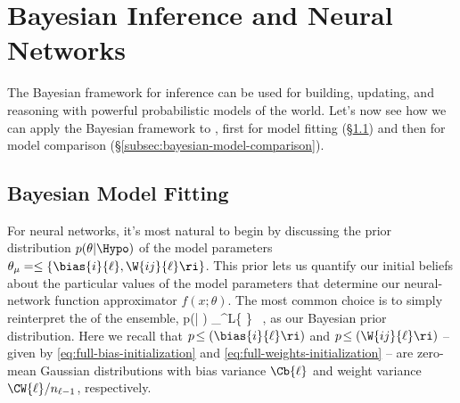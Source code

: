 \section{Bayesian Inference and Neural Networks}\label{sec:PP-Bayes-2}
The Bayesian framework for inference can be used for building, updating, and reasoning with powerful probabilistic models of the world.
Let's now see how we can apply the Bayesian framework to , first 
for 
model fitting (\S\ref{subsec:ForIO}) and then 
for 
model comparison (\S\ref{subsec:bayesian-model-comparison}).





\subsection{Bayesian Model Fitting}\label{subsec:ForIO}
For neural networks, it's most natural to begin by discussing the  prior distribution $p(\theta \vert\Hypo)$ of the model parameters $\theta_{\mu}=\le\{\bias{i}{\ell},\W{ij}{\ell}\ri\}$.
This prior lets us quantify our initial beliefs about the particular values of the model parameters that determine our neural-network function approximator $f(x; \theta)$. The most common choice  is to simply reinterpret the  of the ensemble,
\be\label{eq:parameter-prior}
p(\theta | \Hypo) \equiv \prod_{}^{L}\le\{ \le[\prod_{i=1}^{n_
\ell} p\!\le(\bias{i}{\ell}\ri) \ri] \le[ \prod_{i=1}^{n_\ell}\prod_{j=1}^{n_{\ell-1} } p\!\le(\W{ij}{\ell}\ri) \ri] \ri\} \, ,
\ee
as our Bayesian prior distribution.
Here we recall that $p\!\le(\bias{i}{\ell}\ri)$ and $p\!\le(\W{ij}{\ell}\ri)$ -- given by \eqref{eq:full-bias-initialization} and \eqref{eq:full-weights-initialization} -- are zero-mean Gaussian distributions with bias variance $\Cb{\ell}$ and weight variance $\CW{\ell}/n_{\ell-1}$, respectively.

